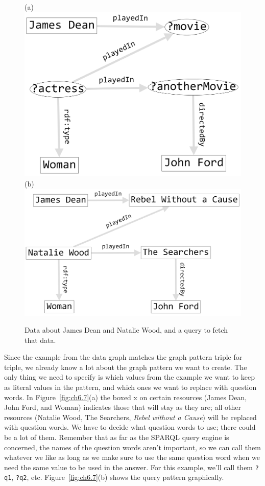 \begin{figure}
\centering
(a)
\includegraphics[width=5in]{SWWOv3/media/ch6/figure6-6a.png}
(b)
\includegraphics[width=5in]{SWWOv3/media/ch6/figure6-6b.png}
\caption{Data about James Dean and Natalie Wood, and a query to fetch that data.}
\label{fig:ch6.6}
\end{figure}


Since the example from the data graph matches the graph pattern triple
for triple, we already know a lot about the graph pattern we want to
create. The only thing we need to specify is which values from the
example we want to keep as literal values in the pattern, and which ones
we want to replace with
question words. In Figure~\ref{fig:ch6.7}(a) the boxed x on certain resources (James
Dean, John Ford, and Woman) indicates those that will stay as they are;
all other resources (Natalie Wood, The Searchers, \emph{Rebel without a
Cause}) will be replaced with question words. We have to decide what
question words to use; there could be a lot of them. Remember that as
far as the SPARQL query engine is concerned, the names of the question
words aren't important, so we can call them whatever we like as long as
we make sure to use the same question word when we need the same value
to be used in the answer. For this example, we'll call them \texttt{?q1}, \texttt{?q2},
etc. Figure~\ref{fig:ch6.7}(b) shows the query pattern graphically.

